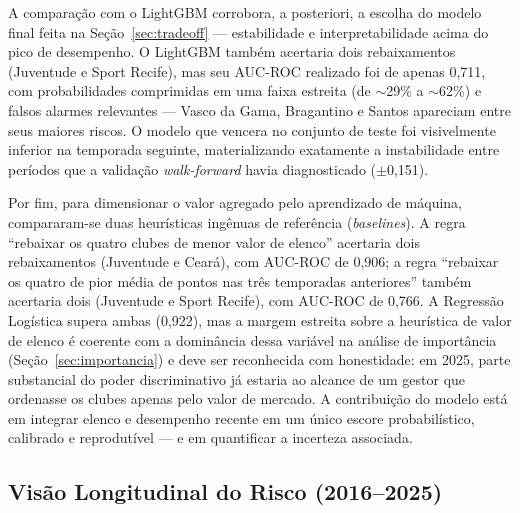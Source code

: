 \documentclass[
    article,
    12pt,
    oneside,
    a4paper,
    english,
    brazilian
    ]{abntex2}
\begin{document}
A comparação com o LightGBM corrobora, a posteriori, a escolha do modelo final feita na Seção~\ref{sec:tradeoff} --- estabilidade e interpretabilidade acima do pico de desempenho. O LightGBM também acertaria dois rebaixamentos (Juventude e Sport Recife), mas seu AUC-ROC realizado foi de apenas 0,711, com probabilidades comprimidas em uma faixa estreita (de $\sim$29\% a $\sim$62\%) e falsos alarmes relevantes --- Vasco da Gama, Bragantino e Santos apareciam entre seus maiores riscos. O modelo que vencera no conjunto de teste foi visivelmente inferior na temporada seguinte, materializando exatamente a instabilidade entre períodos que a validação \textit{walk-forward} havia diagnosticado ($\pm$0,151).

Por fim, para dimensionar o valor agregado pelo aprendizado de máquina, compararam-se duas heurísticas ingênuas de referência (\textit{baselines}). A regra ``rebaixar os quatro clubes de menor valor de elenco'' acertaria dois rebaixamentos (Juventude e Ceará), com AUC-ROC de 0,906; a regra ``rebaixar os quatro de pior média de pontos nas três temporadas anteriores'' também acertaria dois (Juventude e Sport Recife), com AUC-ROC de 0,766. A Regressão Logística supera ambas (0,922), mas a margem estreita sobre a heurística de valor de elenco é coerente com a dominância dessa variável na análise de importância (Seção~\ref{sec:importancia}) e deve ser reconhecida com honestidade: em 2025, parte substancial do poder discriminativo já estaria ao alcance de um gestor que ordenasse os clubes apenas pelo valor de mercado. A contribuição do modelo está em integrar elenco e desempenho recente em um único escore probabilístico, calibrado e reprodutível --- e em quantificar a incerteza associada.

\subsection{Visão Longitudinal do Risco (2016--2025)}
\label{sec:heatmaprisco}
\end{document}
